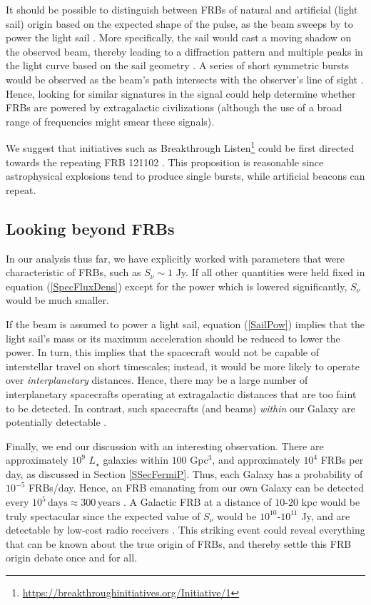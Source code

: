 \documentclass[twocolumn,tighten]{aastex61}
\begin{document}
It should be possible to distinguish between FRBs of natural and artificial (light sail) origin based on the expected shape of the pulse, as the beam sweeps by to power the light sail \citep{GL15}. More specifically, the sail would cast a moving shadow on the observed beam, thereby leading to a diffraction pattern and multiple peaks in the light curve based on the sail geometry \citep{ML16}. A series of short symmetric bursts would be observed as the beam's path intersects with the observer's line of sight \citep{GL15}. Hence, looking for similar signatures in the signal could help determine whether FRBs are powered by extragalactic civilizations (although the use of a broad range of frequencies might smear these signals).

We suggest that initiatives such as Breakthrough Listen\footnote{\url{https://breakthroughinitiatives.org/Initiative/1}} could be first directed towards the repeating FRB 121102 \citep{SSH16,SSHC16,Chat17,Tend17}. This proposition is reasonable since astrophysical explosions tend to produce single bursts, while artificial beacons can repeat.

\subsection{Looking beyond FRBs}
In our analysis thus far, we have explicitly worked with parameters that were characteristic of FRBs, such as $S_\nu \sim 1$ Jy. If all other quantities were held fixed in equation (\ref{SpecFluxDens}) except for the power which is lowered significantly, $S_\nu$ would be much smaller.

If the beam is assumed to power a light sail, equation (\ref{SailPow}) implies that the light sail's mass or its maximum acceleration should be reduced to lower the power. In turn, this implies that the spacecraft would not be capable of interstellar travel on short timescales; instead, it would be more likely to operate over \emph{interplanetary} distances. Hence, there may be a large number of interplanetary spacecrafts operating at extragalactic distances that are too faint to be detected. In contrast, such spacecrafts (and beams) \emph{within} our Galaxy are potentially detectable \citep{GL15}. 

Finally, we end our discussion with an interesting observation. There are approximately $10^9$ $L_\star$ galaxies within $100$ Gpc$^3$, and approximately $10^4$ FRBs per day, as discussed in Section \ref{SSecFermiP}. Thus, each Galaxy has a probability of $10^{-5}$ FRBs/day. Hence, an FRB emanating from our own Galaxy can be detected every $10^5\, \mathrm{days} \approx 300\, \mathrm{years}$ \citep{ML17}. A Galactic FRB at a distance of $10$-$20$ kpc would be truly spectacular since the expected value of $S_\nu$ would be $10^{10}$-$10^{11}$ Jy, and are detectable by low-cost radio receivers \citep{ML17}. This striking event could reveal everything that can be known about the true origin of FRBs, and thereby settle this FRB origin debate once and for all.
\end{document}
